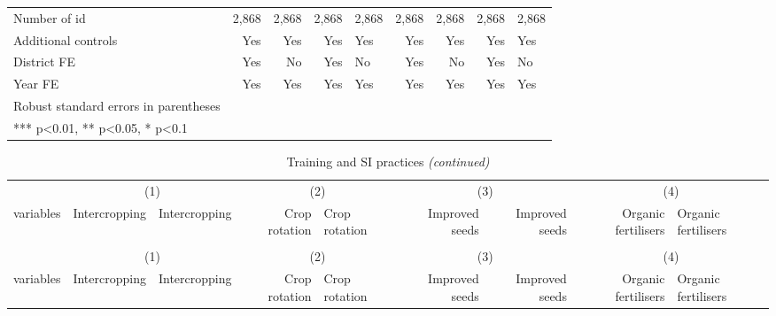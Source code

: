 \documentclass[
]{article}
\begin{document}
\begin{landscape}
\begin{longtable}[t]{lrrrlrrrl}
Number of id & 2,868 & 2,868 & 2,868 & 2,868 & 2,868 & 2,868 & 2,868 & 2,868\\
Additional controls & Yes & Yes & Yes & Yes & Yes & Yes & Yes & Yes\\
\addlinespace
District FE & Yes & No & Yes & No & Yes & No & Yes & No\\
Year FE & Yes & Yes & Yes & Yes & Yes & Yes & Yes & Yes\\
\midrule
Robust standard errors in parentheses &  &  &  &  &  &  &  & \\
*** p<0.01, ** p<0.05, * p<0.1 &  &  &  &  &  &  &  & \\*
\end{longtable}
\end{landscape}
\endgroup{}
\newpage

\begin{landscape}\begingroup\fontsize{7}{9}\selectfont

\begin{longtable}[t]{lrrrlrrrl}
\caption{\label{tab:unnamed-chunk-5}Training and SI practices}\\
\toprule
\multicolumn{1}{c}{ } & \multicolumn{2}{c}{(1)} & \multicolumn{2}{c}{(2)} & \multicolumn{2}{c}{(3)} & \multicolumn{2}{c}{(4)} \\
\cmidrule(l{3pt}r{3pt}){2-3} \cmidrule(l{3pt}r{3pt}){4-5} \cmidrule(l{3pt}r{3pt}){6-7} \cmidrule(l{3pt}r{3pt}){8-9}
variables & Intercropping & Intercropping & Crop rotation & Crop rotation & Improved seeds & Improved seeds & Organic fertilisers & Organic fertilisers\\
\midrule
\endfirsthead
\caption[]{\label{tab:unnamed-chunk-5}Training and SI practices \textit{(continued)}}\\
\toprule
\multicolumn{1}{c}{ } & \multicolumn{2}{c}{(1)} & \multicolumn{2}{c}{(2)} & \multicolumn{2}{c}{(3)} & \multicolumn{2}{c}{(4)} \\
\cmidrule(l{3pt}r{3pt}){2-3} \cmidrule(l{3pt}r{3pt}){4-5} \cmidrule(l{3pt}r{3pt}){6-7} \cmidrule(l{3pt}r{3pt}){8-9}
variables & Intercropping & Intercropping & Crop rotation & Crop rotation & Improved seeds & Improved seeds & Organic fertilisers & Organic fertilisers\\
\midrule
\endhead


\end{longtable}
\end{landscape}
\end{document}
